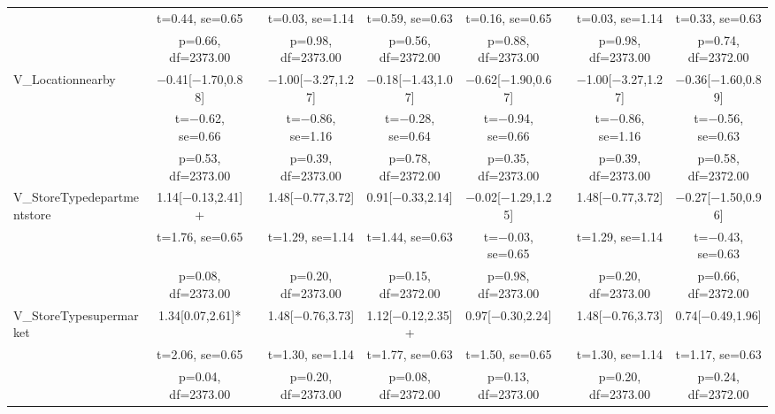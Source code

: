 \documentclass[]{report}
\begin{document}
\begin{table}
{\begin{tabular}[t]{lcccccccc}
		& t=\num{0.44}, se=\num{0.65} &  & t=\num{0.03}, se=\num{1.14} & t=\num{0.59}, se=\num{0.63} & t=\num{0.16}, se=\num{0.65} &  & t=\num{0.03}, se=\num{1.14} & t=\num{0.33}, se=\num{0.63}\\
		& p=\num{0.66}, df=\num{2373.00} &  & p=\num{0.98}, df=\num{2373.00} & p=\num{0.56}, df=\num{2372.00} & p=\num{0.88}, df=\num{2373.00} &  & p=\num{0.98}, df=\num{2373.00} & p=\num{0.74}, df=\num{2372.00}\\
		V\_Locationnearby & \num{-0.41}[\num{-1.70},\num{0.88}] &  & \num{-1.00}[\num{-3.27},\num{1.27}] & \num{-0.18}[\num{-1.43},\num{1.07}] & \num{-0.62}[\num{-1.90},\num{0.67}] &  & \num{-1.00}[\num{-3.27},\num{1.27}] & \num{-0.36}[\num{-1.60},\num{0.89}]\\
		& t=\num{-0.62}, se=\num{0.66} &  & t=\num{-0.86}, se=\num{1.16} & t=\num{-0.28}, se=\num{0.64} & t=\num{-0.94}, se=\num{0.66} &  & t=\num{-0.86}, se=\num{1.16} & t=\num{-0.56}, se=\num{0.63}\\
		& p=\num{0.53}, df=\num{2373.00} &  & p=\num{0.39}, df=\num{2373.00} & p=\num{0.78}, df=\num{2372.00} & p=\num{0.35}, df=\num{2373.00} &  & p=\num{0.39}, df=\num{2373.00} & p=\num{0.58}, df=\num{2372.00}\\
		V\_StoreTypedepartmentstore & \num{1.14}[\num{-0.13},\num{2.41}]+ &  & \num{1.48}[\num{-0.77},\num{3.72}] & \num{0.91}[\num{-0.33},\num{2.14}] & \num{-0.02}[\num{-1.29},\num{1.25}] &  & \num{1.48}[\num{-0.77},\num{3.72}] & \num{-0.27}[\num{-1.50},\num{0.96}]\\
		& t=\num{1.76}, se=\num{0.65} &  & t=\num{1.29}, se=\num{1.14} & t=\num{1.44}, se=\num{0.63} & t=\num{-0.03}, se=\num{0.65} &  & t=\num{1.29}, se=\num{1.14} & t=\num{-0.43}, se=\num{0.63}\\
		& p=\num{0.08}, df=\num{2373.00} &  & p=\num{0.20}, df=\num{2373.00} & p=\num{0.15}, df=\num{2372.00} & p=\num{0.98}, df=\num{2373.00} &  & p=\num{0.20}, df=\num{2373.00} & p=\num{0.66}, df=\num{2372.00}\\
		V\_StoreTypesupermarket & \num{1.34}[\num{0.07},\num{2.61}]* &  & \num{1.48}[\num{-0.76},\num{3.73}] & \num{1.12}[\num{-0.12},\num{2.35}]+ & \num{0.97}[\num{-0.30},\num{2.24}] &  & \num{1.48}[\num{-0.76},\num{3.73}] & \num{0.74}[\num{-0.49},\num{1.96}]\\
		& t=\num{2.06}, se=\num{0.65} &  & t=\num{1.30}, se=\num{1.14} & t=\num{1.77}, se=\num{0.63} & t=\num{1.50}, se=\num{0.65} &  & t=\num{1.30}, se=\num{1.14} & t=\num{1.17}, se=\num{0.63}\\
		& p=\num{0.04}, df=\num{2373.00} &  & p=\num{0.20}, df=\num{2373.00} & p=\num{0.08}, df=\num{2372.00} & p=\num{0.13}, df=\num{2373.00} &  & p=\num{0.20}, df=\num{2373.00} & p=\num{0.24}, df=\num{2372.00}\\

\end{tabular}}
\end{table}
\end{document}
